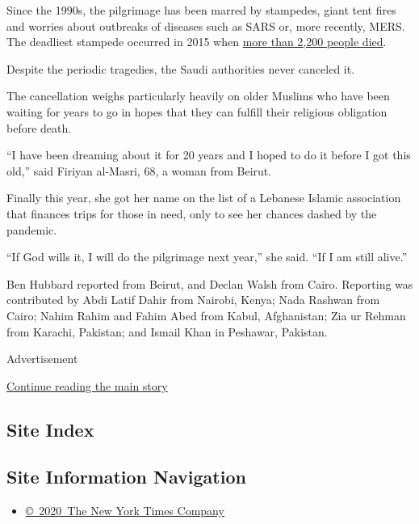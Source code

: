 Since the 1990s, the pilgrimage has been marred by stampedes, giant tent
fires and worries about outbreaks of diseases such as SARS or, more
recently, MERS. The deadliest stampede occurred in 2015 when
\href{https://www.nytimes.com/2015/12/11/world/middleeast/death-toll-from-hajj-stampede.html}{more
than 2,200 people died}.

Despite the periodic tragedies, the Saudi authorities never canceled it.

The cancellation weighs particularly heavily on older Muslims who have
been waiting for years to go in hopes that they can fulfill their
religious obligation before death.

``I have been dreaming about it for 20 years and I hoped to do it before
I got this old,'' said Firiyan al-Masri, 68, a woman from Beirut.

Finally this year, she got her name on the list of a Lebanese Islamic
association that finances trips for those in need, only to see her
chances dashed by the pandemic.

``If God wills it, I will do the pilgrimage next year,'' she said. ``If
I am still alive.''

Ben Hubbard reported from Beirut, and Declan Walsh from Cairo. Reporting
was contributed by Abdi Latif Dahir from Nairobi, Kenya; Nada Rashwan
from Cairo; Nahim Rahim and Fahim Abed from Kabul, Afghanistan; Zia ur
Rehman from Karachi, Pakistan; and Ismail Khan in Peshawar, Pakistan.

Advertisement

\protect\hyperlink{after-bottom}{Continue reading the main story}

\hypertarget{site-index}{%
\subsection{Site Index}\label{site-index}}

\hypertarget{site-information-navigation}{%
\subsection{Site Information
Navigation}\label{site-information-navigation}}

\begin{itemize}
\tightlist
\item
  \href{https://help.nytimes.com/hc/en-us/articles/115014792127-Copyright-notice}{©~2020~The
  New York Times Company}
\end{itemize}

